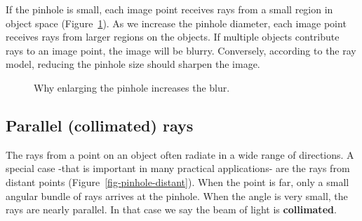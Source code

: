\documentclass[
  letterpaper,
]{book}
\begin{document}
If the pinhole is small, each image point receives rays from a small
region in object space (Figure~\ref{fig-pinhole-blur}). As we increase
the pinhole diameter, each image point receives rays from larger regions
on the objects. If multiple objects contribute rays to an image point,
the image will be blurry. Conversely, according to the ray model,
reducing the pinhole size should sharpen the image.

\begin{figure}


\caption{\label{fig-pinhole-blur}Why enlarging the pinhole increases the
blur.}

\end{figure}%

\subsection{Parallel (collimated) rays}\label{sec-pinhole-collimated}

The rays from a point on an object often radiate in a wide range of
directions. A special case -that is important in many practical
applications- are the rays from distant points
(Figure~\ref{fig-pinhole-distant}). When the point is far, only a small
angular bundle of rays arrives at the pinhole. When the angle is very
small, the rays are nearly parallel. In that case we say the beam of
light is \textbf{collimated}.
\end{document}
